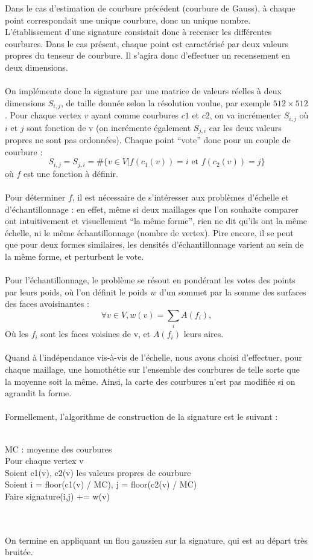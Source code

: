 \documentclass{llncs}
\begin{document}
Dans le cas d’estimation de courbure précédent (courbure de Gauss), à chaque point correspondait une unique courbure, donc un unique nombre. L’établissement d’une signature consistait donc à recenser les différentes courbures. Dans le cas présent, chaque point est caractérisé par deux valeurs propres du tenseur de courbure. Il s’agira donc d’effectuer un recensement en deux dimensions.
\\\\
On implémente donc la signature par une matrice de valeurs réelles à deux dimensions $S_{i,j}$, de taille donnée selon la résolution voulue, par exemple $ 512 \times 512 $. Pour chaque vertex $ v $ ayant comme courbures $ c1$ et $c2 $, on va incrémenter $ S_{i,j} $ où $i$ et $j$ sont fonction de v (on incrémente également $ S_{j,i} $ car les deux valeurs propres ne sont pas ordonnées). Chaque point ``vote'' donc pour un couple de courbure :
$$
S_{i,j} = S_{j,i} = \# \{v\in V|f(c_1(v))=i \mbox{ et } f(c_2(v))=j \}
$$
où $f$ est une fonction à définir.
\\\\
Pour déterminer $f$, il est nécessaire de s’intéresser aux problèmes d’échelle et d’échantillonnage : en effet, même si deux maillages que l’on souhaite comparer ont intuitivement et visuellement ``la même forme'', rien ne dit qu’ils ont la même échelle, ni le même échantillonnage (nombre de vertex). Pire encore, il se peut que pour deux formes similaires, les densités d’échantillonnage varient au sein de la même forme, et perturbent le vote.
\\\\
Pour l’échantillonnage, le problème se résout en pondérant les votes des points par leurs poids, où l’on définit le poids $w$ d’un sommet par la somme des surfaces des faces avoisinantes :
$$
\forall v\in V, w(v) = \sum_{i}{A(f_i)},
$$
Où les $f_i$ sont les faces voisines de v, et $A(f_i)$ leurs aires.
\\\\
Quand à l'indépendance vis-à-vis de l'échelle, nous avons choisi d’effectuer, pour chaque maillage, une homothétie sur l’ensemble des courbures de telle sorte que la moyenne soit la même. Ainsi, la carte des courbures n’est pas modifiée si on agrandit la forme.
\\\\
Formellement, l’algorithme de construction de la signature est le suivant :
\\\\
\begin{ttfamily}
MC : moyenne des courbures\\
Pour chaque vertex v\\
\indent Soient c1(v), c2(v) les valeurs propres de courbure\\
\indent Soient i = floor(c1(v) / MC), j = floor(c2(v) / MC)\\
\indent Faire signature(i,j) += w(v)
\end{ttfamily}
\\\\
On termine en appliquant un flou gaussien sur la signature, qui est au départ très bruitée.
\end{document}
